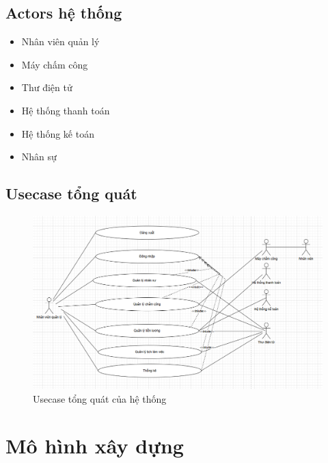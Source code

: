 \subsection{Actors hệ thống}
\begin{itemize}
    \item Nhân viên quản lý 
    \item Máy chấm công
    \item Thư điện tử
    \item Hệ thống thanh toán 
    \item Hệ thống kế toán
    \item Nhân sự
\end{itemize}
\subsection{Usecase tổng quát}
\begin{figure}[H]
    \centering
    \includegraphics[width=\textwidth]{images/usecase.png}
    \caption{Usecase tổng quát của hệ thống}
    \label{fig:usecase-tong-quat}
\end{figure}

\section{Mô hình xây dựng}
